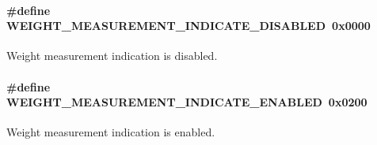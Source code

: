 \paragraph[{\texorpdfstring{W\+E\+I\+G\+H\+T\+\_\+\+M\+E\+A\+S\+U\+R\+E\+M\+E\+N\+T\+\_\+\+I\+N\+D\+I\+C\+A\+T\+E\+\_\+\+D\+I\+S\+A\+B\+L\+ED}{WEIGHT_MEASUREMENT_INDICATE_DISABLED}}]{\setlength{\rightskip}{0pt plus 5cm}\#define W\+E\+I\+G\+H\+T\+\_\+\+M\+E\+A\+S\+U\+R\+E\+M\+E\+N\+T\+\_\+\+I\+N\+D\+I\+C\+A\+T\+E\+\_\+\+D\+I\+S\+A\+B\+L\+ED~0x0000}\hypertarget{group___w_e_i_g_h_t___m_e_a_s_u_r_e_m_e_n_t___c_c_c_d___d_e_f_ga202ef946d9aaad25774be232d324b591}{}\label{group___w_e_i_g_h_t___m_e_a_s_u_r_e_m_e_n_t___c_c_c_d___d_e_f_ga202ef946d9aaad25774be232d324b591}
Weight measurement indication is disabled. 
\paragraph[{\texorpdfstring{W\+E\+I\+G\+H\+T\+\_\+\+M\+E\+A\+S\+U\+R\+E\+M\+E\+N\+T\+\_\+\+I\+N\+D\+I\+C\+A\+T\+E\+\_\+\+E\+N\+A\+B\+L\+ED}{WEIGHT_MEASUREMENT_INDICATE_ENABLED}}]{\setlength{\rightskip}{0pt plus 5cm}\#define W\+E\+I\+G\+H\+T\+\_\+\+M\+E\+A\+S\+U\+R\+E\+M\+E\+N\+T\+\_\+\+I\+N\+D\+I\+C\+A\+T\+E\+\_\+\+E\+N\+A\+B\+L\+ED~0x0200}\hypertarget{group___w_e_i_g_h_t___m_e_a_s_u_r_e_m_e_n_t___c_c_c_d___d_e_f_gafe94f95c6bf79246c978a577ee75aa08}{}\label{group___w_e_i_g_h_t___m_e_a_s_u_r_e_m_e_n_t___c_c_c_d___d_e_f_gafe94f95c6bf79246c978a577ee75aa08}
Weight measurement indication is enabled. 